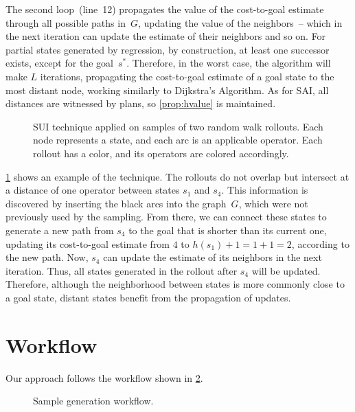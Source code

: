 The second loop~(line~12) propagates the value of the cost-to-goal estimate through all possible paths in~$G$, updating the value of the neighbors~-- which in the next iteration can update the estimate of their neighbors and so on. For partial states generated by regression, by construction, at least one successor exists, except for the goal~$s^*$. Therefore, in the worst case, the algorithm will make $L$ iterations, propagating the cost-to-goal estimate of a goal state to the most distant node, working similarly to Dijkstra's Algorithm. As for SAI, all distances are witnessed by plans, so \cref{prop:hvalue} is maintained.

\begin{figure}[tb]
    \caption[SUI technique applied on samples of random walk rollouts.]{SUI technique applied on samples of two random walk rollouts. Each node represents a state, and each arc is an applicable operator. Each rollout has a color, and its operators are colored accordingly.}
    \label{fig:sui}
    \addmargin
    \centering
    
\end{figure}

\cref{fig:sui} shows an example of the technique. The rollouts do not overlap but intersect at a distance of one operator between states $s_1$ and $s_4$. This information is discovered by inserting the black arcs into the graph~$G$, which were not previously used by the sampling. From there, we can connect these states to generate a new path from $s_4$ to the goal that is shorter than its current one, updating its cost-to-goal estimate from $4$ to $h(s_1)+1=1+1=2$, according to the new path. Now, $s_4$ can update the estimate of its neighbors in the next iteration. Thus, all states generated in the rollout after $s_4$ will be updated. Therefore, although the neighborhood between states is more commonly close to a goal state, distant states benefit from the propagation of updates.

\section{Workflow}
\label{sec:workflow}

Our approach follows the workflow shown in \cref{fig:workflow}.

\begin{figure}[tb]
    \caption{Sample generation workflow.}
    \label{fig:workflow}
    \addmargin
    \centering
    
\end{figure}

